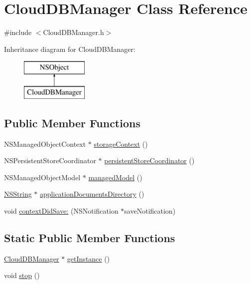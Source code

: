 \hypertarget{interface_cloud_d_b_manager}{
\section{\-Cloud\-D\-B\-Manager \-Class \-Reference}
\label{interface_cloud_d_b_manager}
}


{\ttfamily \#include $<$\-Cloud\-D\-B\-Manager.\-h$>$}

\-Inheritance diagram for \-Cloud\-D\-B\-Manager\-:\begin{figure}[H]
\begin{center}
\leavevmode
\includegraphics[height=2.000000cm]{interface_cloud_d_b_manager}
\end{center}
\end{figure}
\subsection*{\-Public \-Member \-Functions}
\begin{DoxyCompactItemize}
\item 
\-N\-S\-Managed\-Object\-Context $\ast$ \hyperlink{interface_cloud_d_b_manager_aa507224186092847810e4eafbc32f4f8}{storage\-Context} ()
\item 
\-N\-S\-Persistent\-Store\-Coordinator $\ast$ \hyperlink{interface_cloud_d_b_manager_a6cd9c78a9538f72c2a5948939c737094}{persistent\-Store\-Coordinator} ()
\item 
\-N\-S\-Managed\-Object\-Model $\ast$ \hyperlink{interface_cloud_d_b_manager_abbab662a92defb3dce9caed61b819bd0}{managed\-Model} ()
\item 
\hyperlink{class_n_s_string}{\-N\-S\-String} $\ast$ \hyperlink{interface_cloud_d_b_manager_a56d373e0130a6dafe8f6c35488c7a15d}{application\-Documents\-Directory} ()
\item 
void \hyperlink{interface_cloud_d_b_manager_a676333ea588abc2e27d2960ce7be920b}{context\-Did\-Save\-:} (\-N\-S\-Notification $\ast$save\-Notification)
\end{DoxyCompactItemize}
\subsection*{\-Static \-Public \-Member \-Functions}
\begin{DoxyCompactItemize}
\item 
\hyperlink{interface_cloud_d_b_manager}{\-Cloud\-D\-B\-Manager} $\ast$ \hyperlink{interface_cloud_d_b_manager_a53b92ff0a2cc27e6185d08a7137fd260}{get\-Instance} ()
\item 
void \hyperlink{interface_cloud_d_b_manager_a2801eda75d1a0b653d16fab81e7076b2}{stop} ()
\end{DoxyCompactItemize}
